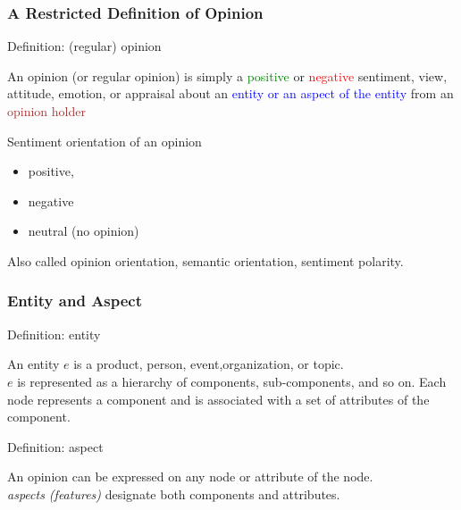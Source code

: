 \documentclass[t]{beamer}
\begin{document}
\begin{frame} \frametitle{A Restricted Definition of Opinion} %

\begin{block}{Definition: (regular) opinion }

  An opinion (or regular opinion) is simply a \textcolor{green}{positive}
    or \textcolor{red}{negative} sentiment, view, attitude, emotion, or appraisal
  about an \textcolor{blue}{entity or an aspect of the entity}
from an \textcolor{brown}{opinion holder}

\end{block}

\begin{block}{Sentiment orientation of an opinion}

\begin{itemize}
\item positive, 
\item negative
\item neutral (no opinion)
\end{itemize}
Also called opinion orientation, semantic orientation, sentiment polarity.

\end{block}


\end{frame} 


\begin{frame} \frametitle{Entity and Aspect } %


\begin{block}{Definition: entity} 

An entity $e$ is a product, person, event,organization, or topic. \\

$e$ is represented as a hierarchy of components, sub-components, and
so on. Each node represents a component and is associated with a set
of attributes of the component. 

\end{block}

\begin{block}{Definition: aspect} 

An opinion can be expressed on any node or attribute of the node. \\

{\em aspects (features)} designate both components and attributes.

\end{block}

\end{frame} 
\end{document}
